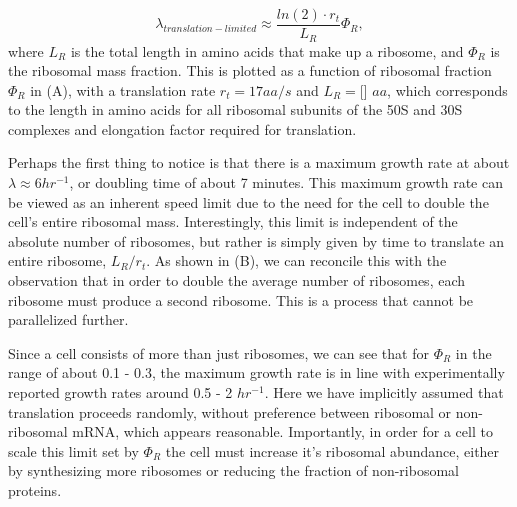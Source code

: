 \begin{equation}
\lambda_{translation-limited} \approx \frac{ln(2) \cdot r_t}{L_R}  \Phi_R,
\end{equation}
where $L_R$ is the total length in amino acids that make up a ribosome, and
$\Phi_R$ is the ribosomal mass fraction. This is plotted as a function of
ribosomal fraction $\Phi_R$ in (A), with a translation rate
$r_t = 17 aa/s$ and $L_R = $[] $aa$, which corresponds to the length in amino
acids for all ribosomal subunits of the 50S and 30S complexes and elongation
factor required for translation.

Perhaps the first thing to notice is that there is a maximum growth rate at
about $\lambda \approx 6 hr^{-1}$, or doubling time of
about 7 minutes. This maximum growth rate can be viewed as an inherent speed
limit due to the need for the cell to double the cell's entire ribosomal mass.
Interestingly, this limit is independent of the absolute number of ribosomes,
but rather  is simply given by time to translate an entire ribosome, $L_R/ r_t$.
As shown in (B),  we can reconcile this with the observation
that in order  to double the average number of ribosomes, each ribosome must
produce a second  ribosome. This is a process that cannot be parallelized
further.



Since a cell consists of more than just ribosomes, we can see that for $\Phi_R$
in the range of about 0.1 - 0.3, the maximum growth rate is in line with
experimentally reported growth rates around 0.5 - 2 $hr^{-1}$. Here we have
implicitly assumed that translation proceeds randomly, without preference
between ribosomal or non-ribosomal mRNA, which appears reasonable. Importantly,
in order for a cell to scale this limit set by $\Phi_R$ the cell must increase
it's ribosomal abundance, either by synthesizing more ribosomes or reducing the
fraction of non-ribosomal proteins.

